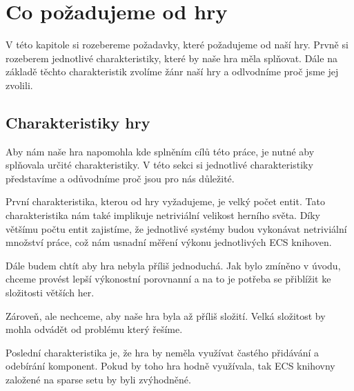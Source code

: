 \chapter{Co požadujeme od hry}
V této kapitole si rozebereme požadavky, které požadujeme od naší hry. Prvně si rozeberem jednotlivé charakteristiky, které by naše hra měla splňovat. Dále na základě těchto charakteristik zvolíme žánr naší hry a odlvodníme proč jsme jej zvolili.


\section{Charakteristiky hry}
Aby nám naše hra napomohla kde splněním cílů této práce, je nutné aby splňovala určité charakteristiky. V této sekci si jednotlivé charakteristiky představíme a odůvodníme proč jsou pro nás důležité.

První charakteristika, kterou od hry vyžadujeme, je velký počet entit. Tato charakteristika nám také implikuje netriviální velikost herního světa. Díky většímu počtu entit zajistíme, že jednotlivé systémy budou vykonávat netriviální množství práce, což nám usnadní měření výkonu jednotlivých ECS knihoven.

Dále budem chtít aby hra nebyla příliš jednoduchá. Jak bylo zmíněno v úvodu, chceme provést lepší výkonostní porovnanní a na to je potřeba se přiblížit ke složitosti větších her.

Zároveň, ale nechceme, aby naše hra byla až příliš složití. Velká složitost by mohla odvádět od problému který řešíme.

Poslední charakteristika je, že hra by neměla využívat častého přidávání a odebírání komponent. Pokud by toho hra hodně využívala, tak ECS knihovny založené na sparse setu by byli zvýhodněné.


